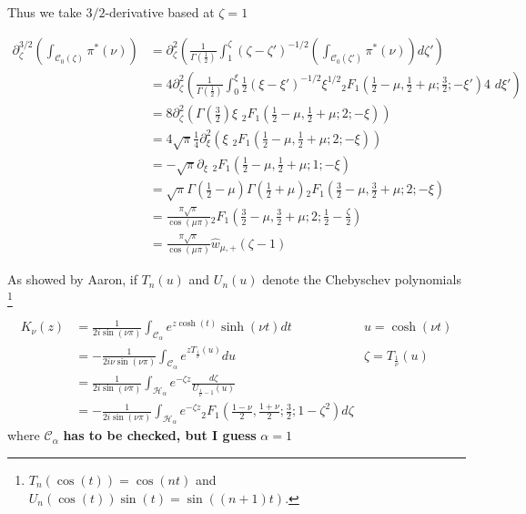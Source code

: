 \documentclass{article}
\begin{document}
Thus we take $3/2$-derivative based at $\zeta=1$

\begin{align*}
\partial_{\zeta}^{3/2}\left(\int_{\mathcal{C}_0(\zeta)}\pi^*(\nu)\right)&=\partial_\zeta^2\left(\frac{1}{\Gamma\left(\frac{1}{2}\right)}\int_1^\zeta(\zeta-\zeta')^{-1/2}\left(\int_{\mathcal{C}_0(\zeta')}\pi^*(\nu)\right)d\zeta'\right)\\
&=4\partial_\zeta^2\left(\frac{1}{\Gamma\left(\frac{1}{2}\right)}\int_0^\xi\frac{1}{2}(\xi-\xi')^{-1/2}\xi^{1/2} {}_2F_1\left(\frac{1}{2}-\mu,\frac{1}{2}+\mu;\frac{3}{2};-\xi'\right) 4\,\,d\xi'\right)\\
&=8\partial_\zeta^2\left(\Gamma\left(\frac{3}{2}\right)\xi\,\,{}_2F_1\left(\frac{1}{2}-\mu,\frac{1}{2}+\mu;2;-\xi\right)\right) \\
&=4\sqrt{\pi}\frac{1}{4}\partial_\xi^2\left(\xi\,\,{}_2F_1\left(\frac{1}{2}-\mu,\frac{1}{2}+\mu;2;-\xi\right)\right)\\
&=-\sqrt{\pi}\partial_{\xi}\,\, {}_2F_1\left(\frac{1}{2}-\mu,\frac{1}{2}+\mu;1;-\xi\right)\\
&=\sqrt{\pi}\Gamma\left(\frac{1}{2}-\mu\right)\Gamma\left(\frac{1}{2}+\mu\right){}_2F_1\left(\frac{3}{2}-\mu,\frac{3}{2}+\mu;2;-\xi\right)\\
&=\frac{\pi\sqrt{\pi}}{\cos(\mu \pi)}{}_2F_1\left(\frac{3}{2}-\mu,\frac{3}{2}+\mu;2;\frac{1}{2}-\frac{\zeta}{2}\right)\\
&=\frac{\pi\sqrt{\pi}}{\cos(\mu \pi)}\hat{w}_{\mu,+}(\zeta-1)
\end{align*}




\color{orange}
As showed by Aaron, if $T_n(u)$ and $U_n(u)$ denote the Chebyschev polynomials \footnote{$T_n(\cos(t))=\cos(nt)$ and $U_n(\cos(t))\sin(t)=\sin((n+1)t)$.} 

\begin{align*}
K_{\nu}(z)&=\frac{1}{2 i\sin(\nu \pi)}\int_{\mathcal{C}_{\alpha}}e^{z\cosh(t)}\sinh(\nu t) dt & u=\cosh(\nu t)\\
&=-\frac{1}{2i\nu\sin(\nu\pi)}\int_{\mathcal{C}_{\alpha}}e^{zT_{\frac{1}{\nu}}(u)}du & \zeta=T_{\frac{1}{\nu}}(u)\\
&=\frac{1}{2i\sin(\nu\pi)}\int_{\mathcal{H}_{\alpha}}e^{-\zeta z}\frac{d\zeta}{U_{\frac{1}{\nu}-1}(u)}\\
&=-\frac{1}{2i\sin(\nu\pi)}\int_{\mathcal{H}_{\alpha}}e^{-\zeta z}{}_2F_1\left(\frac{1-\nu}{2},\frac{1+\nu}{2};\frac{3}{2};1-\zeta^2\right)d\zeta
\end{align*}
where $\mathcal{C}_{\alpha}$ \textbf{has to be checked, but I guess } $\alpha=1$
\end{document}
